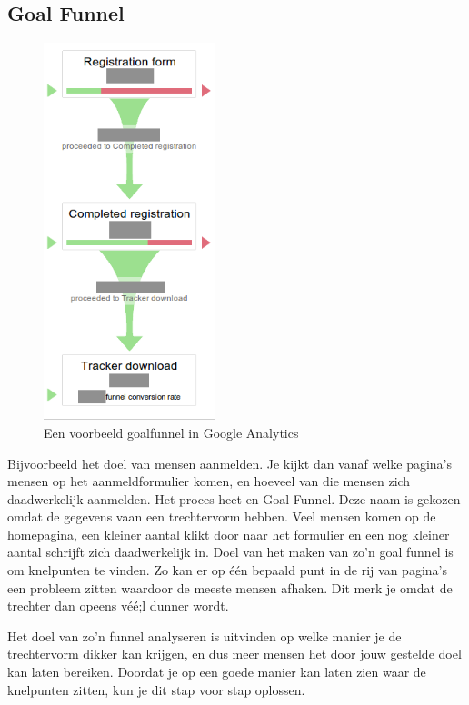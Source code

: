 \documentclass[a4paper, 10pt, pdftex]{report}
\begin{document}
    \subsection{Goal Funnel}
      \begin{figure}
      \caption{Een voorbeeld goalfunnel in Google Analytics}
        \includegraphics[width=50mm]{../images/goalfunnel}
    \end{figure}

    Bijvoorbeeld het doel van mensen aanmelden. Je kijkt dan vanaf welke pagina's mensen op het aanmeldformulier komen, en hoeveel van die mensen zich daadwerkelijk aanmelden. Het proces heet en Goal Funnel. Deze naam is gekozen omdat de gegevens vaan een trechtervorm hebben. Veel mensen komen op de homepagina, een kleiner aantal klikt door naar het formulier en een nog kleiner aantal schrijft zich daadwerkelijk in. Doel van het maken van zo'n goal funnel is om knelpunten te vinden. Zo kan er op \'e\'en bepaald punt in de rij van pagina's een probleem zitten waardoor de meeste mensen afhaken. Dit merk je omdat de trechter dan opeens v\'e\'e;l dunner wordt.

    Het doel van zo'n funnel analyseren is uitvinden op welke manier je de trechtervorm dikker kan krijgen, en dus meer mensen het door jouw gestelde doel kan laten bereiken. Doordat je op een goede manier kan laten zien waar de knelpunten zitten, kun je dit stap voor stap oplossen.
\end{document}
